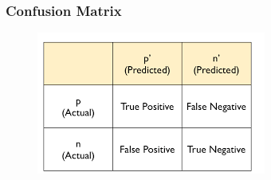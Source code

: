 \documentclass[PredictiveAnalytics101.tex]{subfiles}
\begin{document}
\begin{frame}
\frametitle{Confusion Matrix}

	\begin{figure}
\centering
\includegraphics[width=0.99\linewidth]{images/confusionmatrix2}
\end{figure}

\end{frame}
\end{document}
